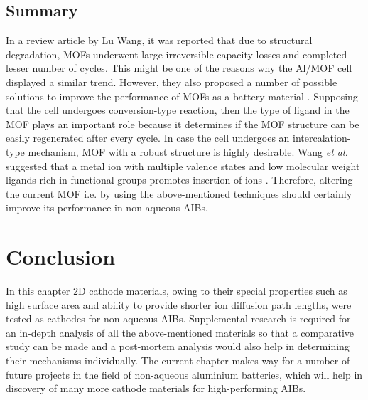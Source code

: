 \subsection{Summary}
In a review article by Lu Wang, it was reported that due to structural degradation, MOFs underwent large irreversible capacity losses and completed lesser number of cycles. This might be one of the reasons why the Al/MOF cell displayed a similar trend. However, they also proposed a number of possible solutions to improve the performance of MOFs as a battery material \cite{wang_metalorganic_2016}. Supposing that the cell undergoes conversion-type reaction, then the type of ligand in the MOF plays an important role because it determines if the MOF structure can be easily regenerated after every cycle. In case the cell undergoes an intercalation-type mechanism, MOF with a robust structure is highly desirable. Wang \textit{et al.} suggested that a metal ion with multiple valence states and low molecular weight ligands rich in functional groups promotes insertion of  ions \cite{wang_metalorganic_2016}. Therefore, altering the current MOF i.e.  by using the above-mentioned techniques should certainly improve its performance in non-aqueous AIBs. 

\section{Conclusion}
In this chapter 2D cathode materials, owing to their special properties such as high surface area and ability to provide shorter ion diffusion path lengths, were tested as cathodes for non-aqueous AIBs.  
Supplemental research is required for an in-depth analysis of all the above-mentioned materials so that a comparative study can be made and a post-mortem analysis would also help in determining their mechanisms individually. The current chapter makes way for a number of future projects in the field of non-aqueous aluminium batteries, which will help in discovery of many more cathode materials for high-performing AIBs.  
